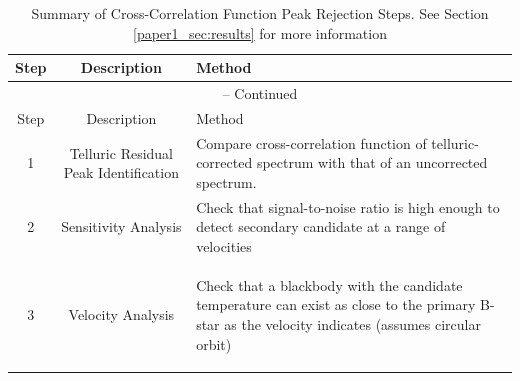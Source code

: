   
  
 \begin{small}
   \begin{longtable}{|ccp{6cm}|}
      \caption{Summary of Cross-Correlation Function Peak Rejection Steps. See Section \ref{paper1_sec:results} for more information} \\
        \hline
        Step  & Description & Method \\ \hline
        \endfirsthead

        \multicolumn{3}{c}{{\tablename} \thetable{} -- Continued} \\
        \hline
        Step  & Description & Method \\ \hline
        \endhead

        \hline
        \endfoot

        \hline
        \endlastfoot

        1 & Telluric Residual Peak Identification & Compare cross-correlation function of telluric-corrected spectrum with that of an uncorrected spectrum. \\

        \hline
        2 & Sensitivity Analysis & Check that signal-to-noise ratio
        is high enough to detect secondary candidate at a range of velocities \\

        \hline
        3 & Velocity Analysis & Check that a blackbody with the
        candidate temperature can exist as close to the primary B-star as the velocity indicates (assumes circular orbit)
        
        
    \label{paper1_tab:rejection}
  \end{longtable}
 \end{small}

